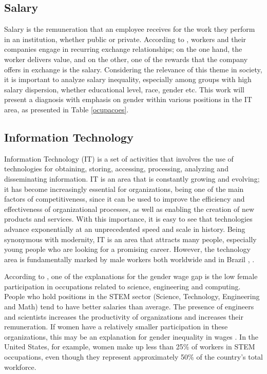 \subsection{Salary}

Salary is the remuneration that an employee receives for the work they perform in an institution, whether public or private. According to \cite{kryscynski2021firm}, workers and their companies engage in recurring exchange relationships; on the one hand, the worker delivers value, and on the other, one of the rewards that the company offers in exchange is the salary.
Considering the relevance of this theme in society, it is important to analyze salary inequality, especially among groups with high salary dispersion, whether educational level, race, gender etc. This work will present a diagnosis with emphasis on gender within various positions in the IT area, as presented in Table \ref{ocupacoes}.

 \subsection{Information Technology}

 Information Technology (IT) is a set of activities that involves the use of technologies for obtaining, storing, accessing, processing, analyzing and disseminating information. IT is an area that is constantly growing and evolving; it has become increasingly essential for organizations, being one of the main factors of competitiveness, since it can be used to improve the efficiency and effectiveness of organizational processes, as well as enabling the creation of new products and services. With this importance, it is easy to see that technologies advance exponentially at an unprecedented speed and scale in history. Being synonymous with modernity, IT is an area that attracts many people, especially young people who are looking for a promising career. However, the technology area is fundamentally marked by male workers both worldwide and in Brazil \cite{de2021evidencias}, \cite{nunes2016genero}.

 According to \cite{de2021evidencias}, one of the explanations for the gender wage gap is the low female participation in occupations related to science, engineering and computing. People who hold positions in the STEM sector (Science, Technology, Engineering and Math) tend to have better salaries than average. The presence of engineers and scientists increases the productivity of organizations and increases their remuneration. If women have a relatively smaller participation in these organizations, this may be an explanation for gender inequality in wages \cite{barth2017effects}. In the United States, for example, women make up less than 25\% of workers in STEM occupations, even though they represent approximately 50\% of the country's total workforce.